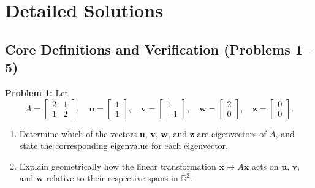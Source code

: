 \documentclass[11pt, letterpaper]{article}
\theoremstyle{definition}
\theoremstyle{remark}
\begin{document}
\newpage

\section{Detailed Solutions}

\subsection{Core Definitions and Verification (Problems 1--5)}

\textbf{Problem 1:}
Let
\[
A = \begin{bmatrix} 2 & 1 \\ 1 & 2 \end{bmatrix}, \quad \mathbf{u} = \begin{bmatrix} 1 \\ 1 \end{bmatrix}, \quad \mathbf{v} = \begin{bmatrix} 1 \\ -1 \end{bmatrix}, \quad \mathbf{w} = \begin{bmatrix} 2 \\ 0 \end{bmatrix}, \quad \mathbf{z} = \begin{bmatrix} 0 \\ 0 \end{bmatrix}.
\]
\begin{enumerate}[label=(\alph*)]
    \item Determine which of the vectors $\mathbf{u}$, $\mathbf{v}$, $\mathbf{w}$, and $\mathbf{z}$ are eigenvectors of $A$, and state the corresponding eigenvalue for each eigenvector.
    \item Explain geometrically how the linear transformation $\mathbf{x} \mapsto A\mathbf{x}$ acts on $\mathbf{u}$, $\mathbf{v}$, and $\mathbf{w}$ relative to their respective spans in $\mathbb{R}^2$.
\end{enumerate}
\end{document}
